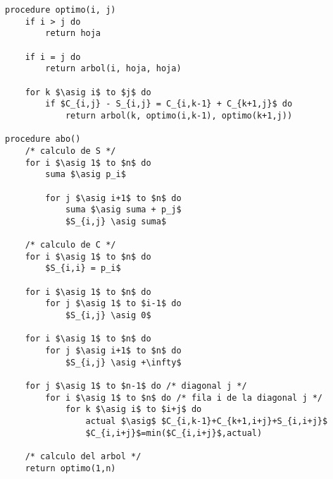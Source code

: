 \documentclass{article}
\newcommand{\asig}{\ensuremath{\leftarrow}}
\begin{document}
\begin{lstlisting}[float,caption={Cálculo del árbol},label=alg:completo]
procedure optimo(i, j)
    if i > j do
        return hoja

    if i = j do
        return arbol(i, hoja, hoja)

    for k $\asig i$ to $j$ do
        if $C_{i,j} - S_{i,j} = C_{i,k-1} + C_{k+1,j}$ do
            return arbol(k, optimo(i,k-1), optimo(k+1,j))

procedure abo()
    /* calculo de S */
    for i $\asig 1$ to $n$ do
        suma $\asig p_i$

        for j $\asig i+1$ to $n$ do
            suma $\asig suma + p_j$
            $S_{i,j} \asig suma$

    /* calculo de C */
    for i $\asig 1$ to $n$ do
        $S_{i,i} = p_i$

    for i $\asig 1$ to $n$ do
        for j $\asig 1$ to $i-1$ do
            $S_{i,j} \asig 0$

    for i $\asig 1$ to $n$ do
        for j $\asig i+1$ to $n$ do
            $S_{i,j} \asig +\infty$

    for j $\asig 1$ to $n-1$ do /* diagonal j */
        for i $\asig 1$ to $n$ do /* fila i de la diagonal j */
            for k $\asig i$ to $i+j$ do
                actual $\asig$ $C_{i,k-1}+C_{k+1,i+j}+S_{i,i+j}$
                $C_{i,i+j}$=min($C_{i,i+j}$,actual)

    /* calculo del arbol */
    return optimo(1,n)
\end{lstlisting}
\end{document}
